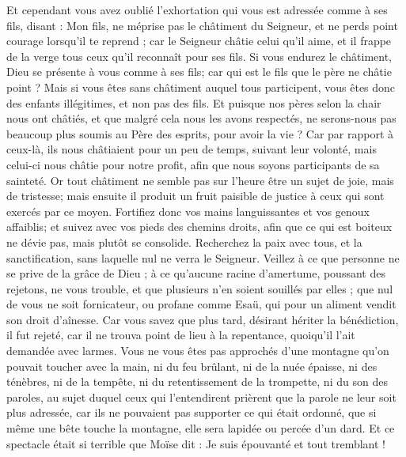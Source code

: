 \begin{multicols}{2}
Et cependant vous avez oublié l'exhortation qui vous est adressée comme à ses fils, disant : Mon fils, ne méprise pas le châtiment du Seigneur, et ne perds point courage lorsqu'il te reprend ;
car le Seigneur châtie celui qu'il aime, et il frappe de la verge tous ceux qu'il reconnaît pour ses fils.
Si vous endurez le châtiment, Dieu se présente à vous comme à ses fils; car qui est le fils que le père ne châtie point ?
Mais si vous êtes sans châtiment auquel tous participent, vous êtes donc des enfants illégitimes, et non pas des fils.
Et puisque nos pères selon la chair nous ont châtiés, et que malgré cela nous les avons respectés, ne serons-nous pas beaucoup plus soumis au Père des esprits, pour avoir la vie ?
Car par rapport à ceux-là, ils nous châtiaient pour un peu de temps, suivant leur volonté, mais celui-ci nous châtie pour notre profit, afin que nous soyons participants de sa sainteté.
Or tout châtiment ne semble pas sur l'heure être un sujet de joie, mais de tristesse; mais ensuite il produit un fruit paisible de justice à ceux qui sont exercés par ce moyen.
Fortifiez donc vos mains languissantes et vos genoux affaiblis;
et suivez avec vos pieds des chemins droits, afin que ce qui est boiteux ne dévie pas, mais plutôt se consolide.
Recherchez la paix avec tous, et la sanctification, sans laquelle nul ne verra le Seigneur.
Veillez à ce que personne ne se prive de la grâce de Dieu ; à ce qu'aucune racine d'amertume, poussant des rejetons, ne vous trouble, et que plusieurs n'en soient souillés par elles ;
que nul {de vous } ne soit fornicateur, ou profane comme Esaü, qui pour un aliment vendit son droit d'aînesse.
Car vous savez que plus tard, désirant hériter la bénédiction, il fut rejeté, car il ne trouva point de lieu à la repentance, quoiqu'il l'ait demandée avec larmes.
Vous ne vous êtes pas approchés d'une montagne qu'on pouvait toucher avec la main, ni du feu brûlant, ni de la nuée épaisse, ni des ténèbres, ni de la tempête,
ni du retentissement de la trompette, ni du son des paroles, au sujet duquel ceux qui l'entendirent prièrent que la parole ne leur soit plus adressée,
car ils ne pouvaient pas supporter ce qui était ordonné, que si même une bête touche la montagne, elle sera lapidée ou percée d'un dard.
Et ce spectacle était si terrible que Moïse dit : Je suis épouvanté et tout tremblant !

\end{multicols}

